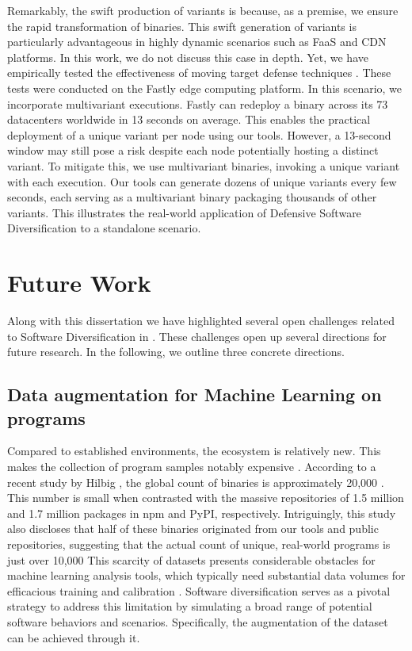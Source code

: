 Remarkably, the swift production of variants is because, as a premise, we ensure the rapid transformation of \Wasm binaries. 
This swift generation of variants is particularly advantageous in highly dynamic scenarios such as FaaS and CDN platforms. 
In this work, we do not discuss this case in depth. 
Yet, we have empirically tested the effectiveness of moving target defense techniques \cite{jackson2011compiler}. 
These tests were conducted on the Fastly edge computing platform.
In this scenario, we incorporate multivariant executions\cite{MEWE}. 
Fastly can redeploy a \Wasm binary across its 73 datacenters worldwide in 13 seconds on average. 
This enables the practical deployment of a unique variant per node using our tools. 
However, a 13-second window may still pose a risk despite each node potentially hosting a distinct \Wasm variant. 
To mitigate this, we use multivariant binaries, invoking a unique variant with each execution. 
Our tools can generate dozens of unique variants every few seconds, each serving as a multivariant binary packaging thousands of other variants. 
This illustrates the real-world application of Defensive Software Diversification to a \Wasm standalone scenario.


\section{Future Work}

Along with this dissertation we have highlighted several open challenges related to Software Diversification in \Wasm.
These challenges open up several directions for future research.
In the following, we outline three concrete directions.


\vspace{-0.3cm}
\subsection{Data augmentation for Machine Learning on \Wasm programs}
Compared to established environments, the \Wasm ecosystem is relatively new. This makes the collection of \Wasm program samples notably expensive \cite{Hilbig2021AnES, 10174194}.
According to a recent study by Hilbig \etal, the global count of \Wasm binaries is approximately 20,000  \cite{Hilbig2021AnES}. 
This number is small when contrasted with the massive repositories of 1.5 million and 1.7 million packages in npm and PyPI, respectively. 
Intriguingly, this study also discloses that half of these \Wasm binaries originated from our tools and public repositories, suggesting that the actual count of unique, real-world \Wasm programs is just over 10,000
This scarcity of \Wasm datasets presents considerable obstacles for machine learning analysis tools, which typically need substantial data volumes for efficacious training and calibration \cite{2023arXiv230519915Z}.
Software diversification serves as a pivotal strategy to address this limitation by simulating a broad range of potential software behaviors and scenarios. 
Specifically, the augmentation of the \Wasm dataset can be achieved through it.

